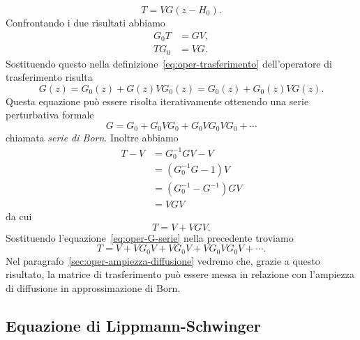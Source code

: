 \documentclass[a4paper,fleqn,twoside,12pt]{article}
\begin{document}
\begin{equation}
  T = VG(z - H_{0}).
\end{equation}
Confrontando i due risultati abbiamo
\begin{subequations}
  \begin{align}
    G_{0} T &= GV, \\
    T G_{0} &= VG.
  \end{align}
\end{subequations}
Sostituendo questo nella definizione~\eqref{eq:oper-trasferimento}
dell'operatore di trasferimento risulta
\begin{equation}
  \label{eq:baz}
  G(z) = G_{0}(z) + G(z)VG_{0}(z) = G_{0}(z) + G_{0}(z)VG(z).
\end{equation}
Questa equazione può essere risolta iterativamente ottenendo una serie
perturbativa formale
\begin{equation}
  \label{eq:oper-G-serie}
  G = G_{0} + G_{0}VG_{0} + G_{0}VG_{0}VG_{0} + \cdots
\end{equation}
chiamata \emph{serie di Born}.  Inoltre abbiamo
\begin{equation}
  \begin{split}
    T - V &= G_{0}^{-1} G V -V \\
    &= (G_{0}^{-1}G - 1)V \\
    &= (G_{0}^{-1} - G^{-1})GV \\
    &= VGV
  \end{split}
\end{equation}
da cui
\begin{equation}
  T = V + VGV.
\end{equation}
Sostituendo l'equazione~\eqref{eq:oper-G-serie} nella precedente troviamo
\begin{equation}
  \label{eq:oper-T-serie}
  T = V + VG_{0}V + VG_{0}V + VG_{0}VG_{0}V + \cdots.
\end{equation}
Nel paragrafo~\ref{sec:oper-ampiezza-diffusione} vedremo che, grazie a questo
risultato, la matrice di trasferimento può essere messa in relazione con
l'ampiezza di diffusione in approssimazione di Born.

\subsection{Equazione di Lippmann-Schwinger}
\label{sec:oper-equazione-di-ls}
\end{document}
